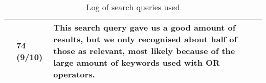 \begin{table}[H]
\begin{adjustwidth}{-1cm}{-1cm}
\begin{tabular}{p{10mm}p{104mm}p{10mm}p{26mm}}
            & 74 (9/10)
            & This search query gave us a good amount of results, but we only recognised about half of those as relevant, most likely because of the large amount of keywords used with OR operators.
            \\
            \bottomrule
      \end{tabular}
\caption{Log of search queries used}
\label{tab:log}
\end{adjustwidth}
\end{table}
